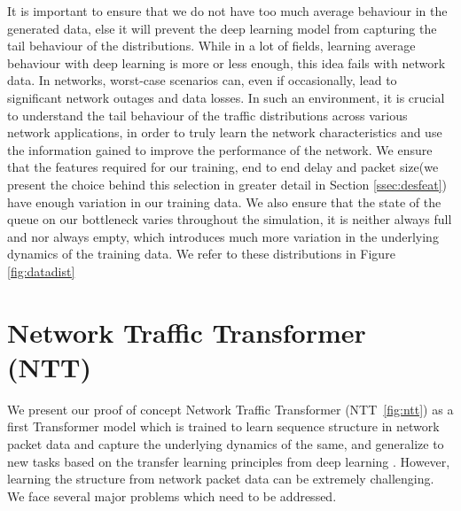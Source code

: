 It is important to ensure that we do not have too much average behaviour in the generated data, else it will prevent the deep learning model from capturing the tail behaviour of the distributions. While in a lot of fields, learning average behaviour with deep learning is more or less enough, this idea fails with network data. In networks, worst-case scenarios can, even if occasionally, lead to significant network outages and data losses. In such an environment, it is crucial to understand the tail behaviour of the traffic distributions across various network applications, in order to truly learn the network characteristics and use the information gained to improve the performance of the network. We ensure that the features required for our training, end to end delay and packet size(we present the choice behind this selection in greater detail in Section \ref{ssec:desfeat}) have enough variation in our training data. We also ensure that the state of the queue on our bottleneck varies throughout the simulation, \ie it is neither always full and nor always empty, which introduces much more variation in the underlying dynamics of the training data. We refer to these distributions in Figure \ref{fig:datadist}


\section{Network Traffic Transformer (NTT)}
\label{sec:ntt}

We present our proof of concept Network Traffic Transformer (NTT~\ref{fig:ntt}) as a first Transformer model which is trained to learn sequence structure in network packet data and capture the underlying dynamics of the same, and generalize to new tasks based on the transfer learning principles from deep learning . However, learning the structure from network packet data can be extremely challenging. We face several major problems which need to be addressed.

